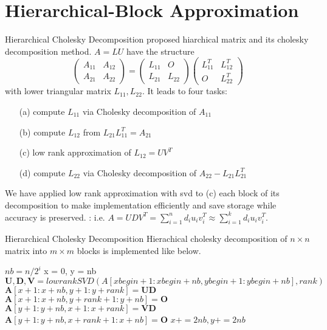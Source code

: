 \section{Hierarchical-Block Approximation}

\begin{frame}{Hierarchical Cholesky Decomposition}
\footnotesize
\citet{hackbusch2015hierarchical} proposed hiarchical matrix and its cholesky decomposition method.
$A=LU$ have the structure
$$\begin{pmatrix}A_{11}&A_{12}\\A_{21}&A_{22}\end{pmatrix}=\begin{pmatrix}L_{11}&O\\L_{21}&L_{22}\end{pmatrix}\begin{pmatrix}L_{11}^T&L_{12}^T\\O&L_{22}^T\end{pmatrix}$$
with lower triangular matrix $L_{11},L_{22}$.
It leads to four tasks:
\begin{itemize}
	\item[(a)] compute $L_{11}$ via Cholesky decomposition of $A_{11}$
	\item[(b)] compute $L_{12}$ from $L_{21}L_{11}^T = A_{21}$
	\item[(c)] low rank approximation of $L_{12}=UV^T$
	\item[(d)] compute $L_{22}$ via Cholesky decomposition of $A_{22}-L_{21}L_{21}^T$
\end{itemize}

We have applied low rank approximation with svd to (c) each block of its decomposition to make implementation efficiently and save storage while accuracy is preserved.
: i.e. $A=UDV^T=\sum_{i=1}^n d_i u_iv_i^T\approx\sum_{i=1}^k d_i u_iv_i^T$.
\end{frame}

\begin{frame}{Hierarchical Cholesky Decomposition}
Hierachical cholesky decomposition of $n\times n$ matrix into $m\times m$ blocks is implemented like below.
\begin{algorithm}[H]
	\caption{Hierachical cholesky decomposition}
	\begin{algorithmic}[1]
		\tiny
		\State $nb = n/2^i$
		\State x = 0, y = nb
		\State $\mathbf{U,D,V} = lowrankSVD(A[xbegin+1:xbegin+nb,ybegin+1:ybegin+nb], rank)$
		\State $\mathbf{A}[x + 1:x + nb, y + 1:y + rank] = \mathbf{UD}$
		\State $\mathbf{A}[x + 1:x + nb, y + rank+1:y + nb] = \mathbf{O}$
		\State $\mathbf{A}[y + 1:y + nb, x + 1:x + rank] = \mathbf{VD}$
		\State $\mathbf{A}[y + 1:y + nb, x + rank+1:x + nb] = \mathbf{O}$
		\State $x += 2nb, y += 2nb$
		\EndFor
		\EndFor
		\EndProcedure
		
	\end{algorithmic}\label{alg:hchol}
\end{algorithm}
\end{frame}

